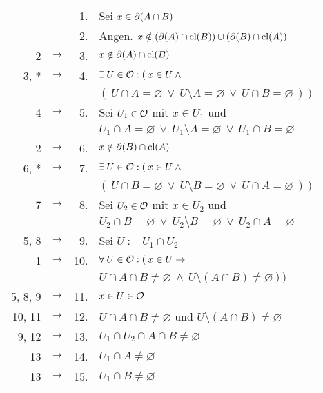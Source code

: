     \begin{longtable}{r c r l}
        & & 1. & Sei $x \in \partial(A \cap B)$ \\
        & & 2. & Angen. $x \notin (\partial(A) \cap \text{cl}(B)) \cup (\partial(B) \cap \text{cl}(A))$ \\
        2 & $\rightarrow$ & 3. & $x \notin \partial(A) \cap \text{cl}(B)$ \\
        3, * & $\rightarrow$ & 4. & $\exists\: U \in \mathcal{O}: (\: x \in U \:\land\:$\\
                             &&& $(\: U \cap A = \varnothing \:\lor\: U \setminus A = \varnothing \:\lor\: U \cap B = \varnothing \:) \:) $ \\
        4 & $\rightarrow$ & 5. & Sei $U_1 \in \mathcal{O}$ mit $x \in U_1$ und\\
                              &&& $U_1 \cap A = \varnothing \:\lor\: U_1 \setminus A = \varnothing \:\lor\: U_1 \cap B = \varnothing$ \\
        2 & $\rightarrow$ & 6. & $x \notin \partial(B) \cap \text{cl}(A)$ \\
        6, * & $\rightarrow$ & 7. & $\exists\: U \in \mathcal{O}: (\: x \in U \:\land\:$\\
                             &&& $(\: U \cap B = \varnothing \:\lor\: U \setminus B = \varnothing \:\lor\: U \cap A = \varnothing \:) \:)$ \\
        7 & $\rightarrow$ & 8. & Sei $U_2 \in \mathcal{O}$ mit $x \in U_2$ und\\
                          &&& $U_2 \cap B = \varnothing \:\lor\: U_2 \setminus B = \varnothing \:\lor\: U_2 \cap A = \varnothing$\\
        5, 8 & $\rightarrow$ & 9. & Sei $U := U_1 \cap U_2$ \\
        1 & $\rightarrow$ & 10. & $\forall\: U \in \mathcal{O}: (\: x \in U \to$\\
                           &&& $U \cap A \cap B \neq \varnothing \:\land\: U \setminus (A \cap B) \neq \varnothing \:) \:) $ \\
        5, 8, 9 & $\rightarrow$ & 11. & $x \in U \in \mathcal{O}$ \\
        10, 11 & $\rightarrow$ & 12. & $U \cap A \cap B \neq \varnothing$ und $U \setminus (A \cap B) \neq \varnothing$ \\
        9, 12 & $\rightarrow$ & 13. & $U_1 \cap U_2 \cap A \cap B \neq \varnothing$ \\
        13 & $\rightarrow$ & 14. & $U_1 \cap A \neq \varnothing$ \\
        13 & $\rightarrow$ & 15. & $U_1 \cap B \neq \varnothing$ \\

\end{longtable}
